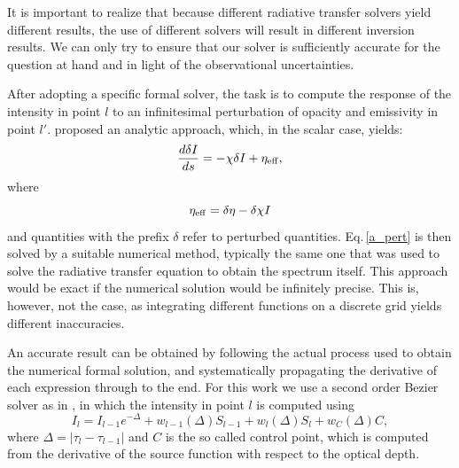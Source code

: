 \documentclass[referee]{aa}
\begin{document}
It is important to realize that because different radiative transfer solvers yield different results, the use of different solvers will result in different inversion results. We can only try to ensure that our solver is sufficiently accurate for the question at hand and in light of the observational uncertainties.

After adopting a specific formal solver, the task is to compute the response of the intensity in point $l$ to an infinitesimal perturbation of opacity and emissivity in point $l'$. \citet{dtibook} proposed an analytic approach, which, in the scalar case, yields:
\begin{equation}
 \frac{d\delta I}{ds} = -\chi \delta I + \eta_{\rm{eff}},
 \label{a_pert}
\end{equation}
where
\begin{equation}
\eta_{\rm{eff}} = \delta \eta - \delta \chi I
\end{equation}
and quantities with the prefix $\delta$ refer to perturbed quantities. Eq.\,\ref{a_pert} is then solved by a suitable numerical method, typically the same one that was used to solve the radiative transfer equation to obtain the spectrum itself. This approach would be exact if the numerical solution would be infinitely precise. This is, however, not the case, as integrating different functions on a discrete grid yields different inaccuracies. 

An accurate result can be obtained by following the actual process used to obtain the numerical formal solution, and systematically propagating the derivative of each expression through to the end. For this work we use a second order Bezier solver as in \citet{JaimeBezier}, in which the intensity in point $l$ is computed using
\begin{equation}
 I_l = I_{l-1} e^{-\Delta} + w_{l-1}(\Delta)S_{l-1} + w_{l}(\Delta) S_l + w_C(\Delta) C,
 \label{bezier}
\end{equation}
where $\Delta=|\tau_l - \tau_{l-1}|$ and $C$ is the so called control point, which is computed from the derivative of the source function with respect to the optical depth. 
\end{document}
